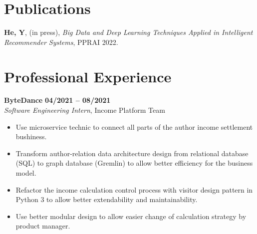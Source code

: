 \documentclass[margin,line]{res}
\begin{document}
\begin{resume}
%



\section{\sc Publications}
\textbf{He, Y}, (in press), \textit{Big Data and Deep Learning Techniques Applied in Intelligent Recommender Systems}, PPRAI 2022.

\section{\sc Professional Experience}

{\bf ByteDance} \hfill {\bf 04/2021 -- 08/2021} \\
\textit{Software Engineering Intern}, {Income Platform Team}
\begin{itemize}
	\item Use microservice technic to connect all parts of the author income settlement bushiness.
	\item Transform author-relation data architecture design from relational database (SQL) to graph database (Gremlin) to allow better efficiency for the business model.
	\item Refactor the income calculation control process with visitor design pattern in Python 3 to allow better extendability and maintainability.
	\item Use better modular design to allow easier change of calculation strategy by product manager.
\end{itemize}

\vspace{-.3cm}


\end{resume}
\end{document}
